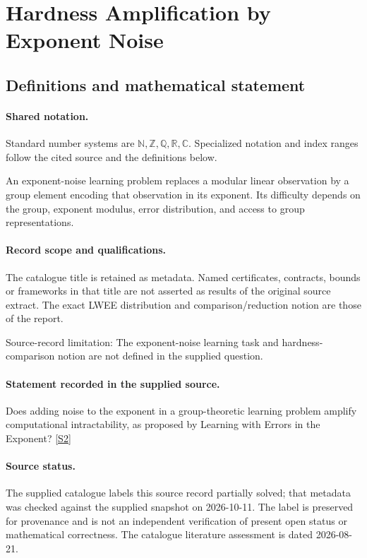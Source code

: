 \documentclass[11pt]{article}
\newcommand{\sref}[2]{\hyperlink{source:#1:#2}{[S#2]}}
\begin{document}
\section{Hardness Amplification by Exponent Noise}\label{statement}

\subsection{Definitions and mathematical statement}

\paragraph{Shared notation.}Standard number systems are $\mathbb N,\mathbb Z,\mathbb Q,\mathbb R,\mathbb C$. Specialized notation and index ranges follow the cited source and the definitions below.


An exponent-noise learning problem replaces a modular linear observation by a group element encoding that observation in its exponent. Its difficulty depends on the group, exponent modulus, error distribution, and access to group representations.
\paragraph{Record scope and qualifications.}
The catalogue title is retained as metadata. Named certificates, contracts, bounds or frameworks in that title are not asserted as results of the original source extract.
The exact LWEE distribution and comparison/reduction notion are those of the report.

Source-record limitation: The exponent-noise learning task and hardness-comparison notion are not defined in the supplied question.
\paragraph{Statement recorded in the supplied source.}
Does adding noise to the exponent in a group-theoretic learning problem amplify computational intractability, as proposed by Learning with Errors in the Exponent? \sref{statement}{2}
\paragraph{Source status.}
The supplied catalogue labels this source record partially solved; that metadata was checked against the supplied snapshot on 2026-10-11. The label is preserved for provenance and is not an independent verification of present open status or mathematical correctness. The catalogue literature assessment is dated 2026-08-21.
\end{document}
